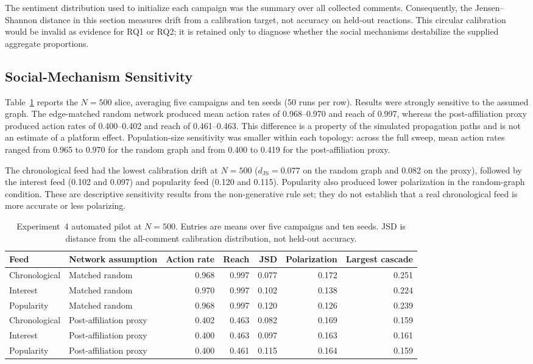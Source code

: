\documentclass[conference]{IEEEtran}
\begin{document}
The sentiment distribution used to initialize each campaign was the summary
over all collected comments. Consequently, the Jensen--Shannon distance in this
section measures drift from a calibration target, not accuracy on held-out
reactions. This circular calibration would be invalid as evidence for RQ1 or
RQ2; it is retained only to diagnose whether the social mechanisms destabilize
the supplied aggregate proportions.

\subsection{Social-Mechanism Sensitivity}

Table~\ref{tab:pilot-exp4} reports the $N=500$ slice, averaging five campaigns
and ten seeds (50 runs per row). Results were strongly sensitive to the assumed
graph. The edge-matched random network produced mean action rates of
0.968--0.970 and reach of 0.997, whereas the post-affiliation proxy produced
action rates of 0.400--0.402 and reach of 0.461--0.463. This difference is a
property of the simulated propagation paths and is not an estimate of a
platform effect. Population-size sensitivity was smaller within each topology:
across the full sweep, mean action rates ranged from 0.965 to 0.970 for the
random graph and from 0.400 to 0.419 for the post-affiliation proxy.

The chronological feed had the lowest calibration drift at $N=500$
($d_{\mathrm{JS}}=0.077$ on the random graph and 0.082 on the proxy), followed
by the interest feed (0.102 and 0.097) and popularity feed (0.120 and 0.115).
Popularity also produced lower polarization in the random-graph condition.
These are descriptive sensitivity results from the non-generative rule set;
they do not establish that a real chronological feed is more accurate or less
polarizing.

\begin{table}[t]
\caption{Experiment~4 automated pilot at $N=500$. Entries are means over five
campaigns and ten seeds. JSD is distance from the all-comment calibration
distribution, not held-out accuracy.}
\label{tab:pilot-exp4}
\centering
\footnotesize
\begin{tabular}{@{}llrrrrr@{}}
\toprule
Feed & Network assumption & Action rate & Reach & JSD & Polarization & Largest cascade \\
\midrule
Chronological & Matched random & 0.968 & 0.997 & 0.077 & 0.172 & 0.251 \\
Interest & Matched random & 0.970 & 0.997 & 0.102 & 0.138 & 0.224 \\
Popularity & Matched random & 0.968 & 0.997 & 0.120 & 0.126 & 0.239 \\
Chronological & Post-affiliation proxy & 0.402 & 0.463 & 0.082 & 0.169 & 0.159 \\
Interest & Post-affiliation proxy & 0.400 & 0.463 & 0.097 & 0.163 & 0.161 \\
Popularity & Post-affiliation proxy & 0.400 & 0.461 & 0.115 & 0.164 & 0.159 \\
\bottomrule
\end{tabular}
\end{table}
\end{document}
